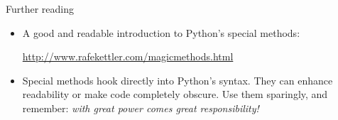 \begin{frame}[fragile]{Further reading}

\begin{itemize}
\item   A good and readable introduction to Python's special methods:
  \begin{center}
    \url{http://www.rafekettler.com/magicmethods.html}
  \end{center}
\item Special methods hook directly into Python's syntax.  They can
  enhance readability or make code completely obscure.  Use them
  sparingly, and remember: \emph{with great power comes great
    responsibility!}
\end{itemize}


  
  
\end{frame}
